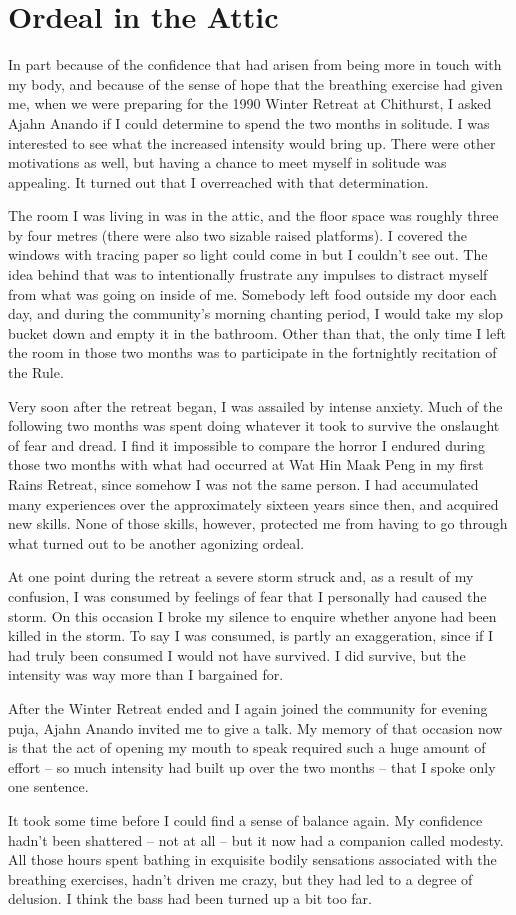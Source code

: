 \chapter{Ordeal in the Attic}

In part because of the confidence that had arisen from being more in
touch with my body, and because of the sense of hope that the breathing
exercise had given me, when we were preparing for the 1990 Winter
Retreat at Chithurst, I asked Ajahn Anando if I could determine to spend
the two months in solitude. I was interested to see what the increased
intensity would bring up. There were other motivations as well, but
having a chance to meet myself in solitude was appealing. It turned out
that I overreached with that determination.

The room I was living in was in the attic, and the floor space was
roughly three by four metres (there were also two sizable raised
platforms). I covered the windows with tracing paper so light could come
in but I couldn't see out. The idea behind that was to intentionally
frustrate any impulses to distract myself from what was going on inside
of me. Somebody left food outside my door each day, and during the
community's morning chanting period, I would take my slop bucket down
and empty it in the bathroom. Other than that, the only time I left the
room in those two months was to participate in the fortnightly
recitation of the Rule.

Very soon after the retreat began, I was assailed by intense anxiety.
Much of the following two months was spent doing whatever it took to
survive the onslaught of fear and dread. I find it impossible to compare
the horror I endured during those two months with what had occurred at
Wat Hin Maak Peng in my first Rains Retreat, since somehow I was not the
same person. I had accumulated many experiences over the approximately
sixteen years since then, and acquired new skills. None of those skills,
however, protected me from having to go through what turned out to be
another agonizing ordeal.

At one point during the retreat a severe storm struck and, as a result
of my confusion, I was consumed by feelings of fear that I personally
had caused the storm. On this occasion I broke my silence to enquire
whether anyone had been killed in the storm. To say I was consumed, is
partly an exaggeration, since if I had truly been consumed I would not
have survived. I did survive, but the intensity was way more than I
bargained for.

After the Winter Retreat ended and I again joined the community for
evening puja, Ajahn Anando invited me to give a talk. My memory of that
occasion now is that the act of opening my mouth to speak required such
a huge amount of effort -- so much intensity had built up over the two
months -- that I spoke only one sentence.

It took some time before I could find a sense of balance again. My
confidence hadn't been shattered -- not at all -- but it now had a
companion called modesty. All those hours spent bathing in exquisite
bodily sensations associated with the breathing exercises, hadn't driven
me crazy, but they had led to a degree of delusion. I think the bass had
been turned up a bit too far.

